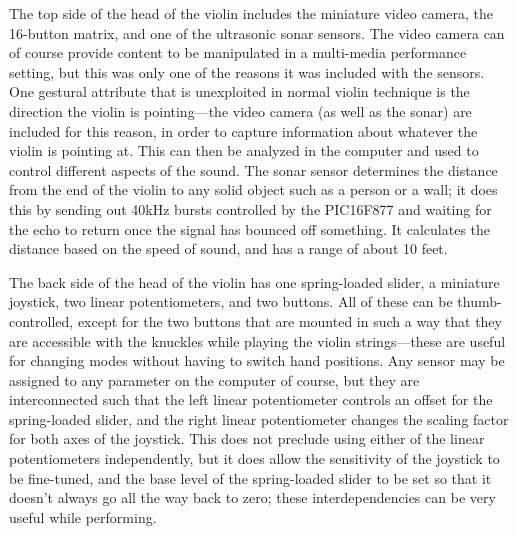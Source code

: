 The top side of the head of the violin includes the miniature video camera, the
16-button matrix, and one of the ultrasonic sonar sensors. The video camera can
of course provide content to be manipulated in a multi-media performance setting,
but this was only one of the reasons it was included with the sensors. One
gestural attribute that is unexploited in normal violin technique is the
direction the violin is pointing---the video camera (as well as the sonar) are
included for this reason, in order to capture information about whatever the
violin is pointing at. This can then be analyzed in the computer and used to
control different aspects of the sound. The sonar sensor determines the distance
from the end of the violin to any solid object such as a person or a wall; it
does this by sending out 40kHz bursts controlled by the PIC16F877 and waiting for
the echo to return once the signal has bounced off something. It calculates the
distance based on the speed of sound, and has a range of about 10 feet.

The back side of the head of the violin has one spring-loaded slider, a
miniature joystick, two linear potentiometers, and two buttons. All of these can
be thumb-controlled, except for the two buttons that are mounted in such a way
that they are accessible with the knuckles while playing the violin
strings---these are useful for changing modes without having to switch hand
positions. Any sensor may be assigned to any parameter on the computer of course,
but they are interconnected such that the left linear potentiometer controls an
offset for the spring-loaded slider, and the right linear potentiometer changes
the scaling factor for both axes of the joystick. This does not preclude using
either of the linear potentiometers independently, but it does allow the
sensitivity of the joystick to be fine-tuned, and the base level of the
spring-loaded slider to be set so that it doesn't always go all the way back to
zero; these interdependencies can be very useful while performing.

